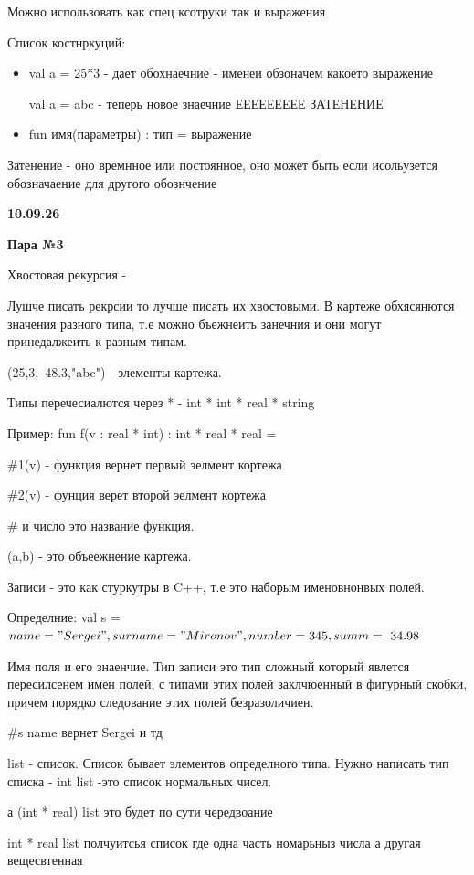 \documentclass{article}
\begin{document}
Можно использовать как спец ксотруки так и выражения

Список костнркуций: 
\begin{itemize}
    \item val a = 25*3 - дает обохнаечние - именеи обзоначем какоето выражение

     val a = abc - теперь новое знаечние ЕЕЕЕЕЕЕЕЕ ЗАТЕНЕНИЕ
    \item fun имя(параметры) : тип = выражение
\end{itemize}



Затенение - оно времнное или постоянное, оно может быть если исольузется обозначаение 
для другого обознчение

\textbf{10.09.26}

\textbf{Пара №3}


Хвостовая рекурсия - 

Лушче писать рекрсии то лучше писать их хвостовыми. 
В картеже обхясянются значения разного типа, т.е можно бъежнеить 
занечния и они могут принедалжеить к разным типам. 

(25,3,~48.3,"abc") - элементы картежа. 

Типы перечесиалются через * - int * int * real * string 

Пример: fun f(v : real * int) :  int * real * real = 

\#1(v) - функция вернет первый эелмент кортежа 

\#2(v) - фунция верет второй эелмент кортежа  

\# и число это название функция.  

(a,b) - это объеежнение картежа.

Записи - это как стуркутры в C++, т.е это наборым именовнонвых полей. 

Определние: val s =  ${name = "Sergei", surname = "Mironov", number = 345, summ = ~34.98}$

Имя поля и его знаенчие. Тип записи это тип сложный который явлется пересилсенем имен полей, 
с типами этих полей заклчюенный в фигурный скобки, причем порядко следование 
этих полей безразоличиен. 


\#s name вернет Sergei 
и тд 

list - список. Список бывает элементов определного типа. Нужно написать тип списка - int list 
-это список нормальных чисел. 

а (int * real) list это будет по сути чередвоание

int * real list полчуитсья список где одна часть номарьныз числа а другая вещесвтенная 
\end{document}
